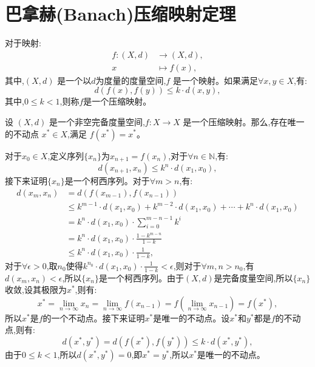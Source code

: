 \section{巴拿赫(Banach)压缩映射定理}
\begin{defn}[压缩映射]\label{def:comp_map}
    对于映射:
\begin{align*}
    f :(X,d) & \to (X,d), \\
    x & \mapsto f(x),
\end{align*}
其中,$(X,d)$ 是一个以$d$为度量的度量空间,$f$ 是一个映射。如果满足$\forall x, y \in X$,有:
\begin{equation}
    d(f(x), f(y)) \leq k \cdot d(x, y),
\end{equation}
其中,$0 \leq k < 1$,则称$f$是一个压缩映射。
\end{defn}

\begin{thm}[巴拿赫压缩映射定理]\label{thm:banach}
    设 $(X, d)$ 是一个非空完备度量空间,$f : X \to X$ 是一个压缩映射。那么,存在唯一的不动点 $x^* \in X$,满足 $f(x^*) = x^*$。
\end{thm}
\begin{pf}
    对于$x_0 \in X$,定义序列$\{x_n\}$为$x_{n+1}=f(x_n)$,对于$\forall n \in \mathbb{N}$,有:
    \begin{equation}
        d(x_{n+1}, x_n)  \leq k^n \cdot d(x_1, x_0),
    \end{equation}
    接下来证明$\{x_n\}$是一个柯西序列。对于$\forall m > n$,有:
    \begin{align*}
        d(x_m,x_n) & = d(f(x_{m-1}), f(x_{n-1})) \\
        & \leq k^{m-1} \cdot d(x_1, x_0) + k^{m-2} \cdot d(x_1, x_0) + \cdots + k^{n} \cdot d(x_1, x_0) \\
        & = k^n \cdot d(x_1, x_0) \cdot \sum_{i=0}^{m-n-1} k^i \\
        & = k^n \cdot d(x_1, x_0) \cdot \frac{1-k^{m-n}}{1-k} \\
        & \leq k^n \cdot d(x_1, x_0) \cdot \frac{1}{1-k},
    \end{align*}
    对于$\forall \epsilon > 0$,取$n_0$使得$k^{n_0} \cdot d(x_1, x_0) \cdot \frac{1}{1-k} < \epsilon$,则对于$\forall m, n > n_0$,有$d(x_m, x_n) < \epsilon$,所以$\{x_n\}$是一个柯西序列。由于$(X, d)$是完备度量空间,所以$\{x_n\}$收敛,设其极限为$x^*$,则有:
    \begin{equation}
        x^* = \lim_{n \to \infty} x_n = \lim_{n \to \infty} f(x_{n-1}) = f(\lim_{n \to \infty} x_{n-1}) = f(x^*),
    \end{equation}
    所以$x^*$是$f$的一个不动点。接下来证明$x^*$是唯一的不动点。设$x^*$和$y^*$都是$f$的不动点,则有:
    \begin{equation}
        d(x^*, y^*) = d(f(x^*), f(y^*)) \leq k \cdot d(x^*, y^*),
    \end{equation}
    由于$0 \leq k < 1$,所以$d(x^*, y^*) = 0$,即$x^* = y^*$,所以$x^*$是唯一的不动点。
\end{pf}
